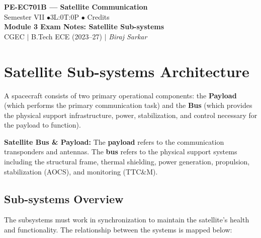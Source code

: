 \documentclass[12pt,a4paper]{article}
\begin{document}

\begin{center}
  {\LARGE\bfseries\color{myred} PE-EC701B --- Satellite Communication}\\[5pt]
  {\normalsize\color{mydark} Semester VII \quad$\bullet$\quad 3L:0T:0P \quad$\bullet$ Credits}\\[3pt]
  {\normalsize\color{myteal}\textbf{Module 3 Exam Notes: Satellite Sub-systems}}\\[3pt]
  {\small\color{mydark} CGEC \;$|$\; B.Tech ECE (2023--27) \;$|$\; \textit{Biraj Sarkar}}
\end{center}
\vspace{2pt}
\noindent{\color{myred}\rule{\linewidth}{1.5pt}}
\vspace{2pt}

\hypersetup{linkcolor=mydark}
\tableofcontents
\hypersetup{linkcolor=myteal}
\newpage

\section{Satellite Sub-systems Architecture}

A spacecraft consists of two primary operational components: the \textbf{Payload} (which performs the primary communication task) and the \textbf{Bus} (which provides the physical support infrastructure, power, stabilization, and control necessary for the payload to function).

\begin{tcolorbox}[defbox]
\textbf{Satellite Bus \& Payload:} The \textbf{payload} refers to the communication transponders and antennas. The \textbf{bus} refers to the physical support systems including the structural frame, thermal shielding, power generation, propulsion, stabilization (AOCS), and monitoring (TTC\&M).
\end{tcolorbox}

\subsection{Sub-systems Overview}
The subsystems must work in synchronization to maintain the satellite's health and functionality. The relationship between the systems is mapped below:
\end{document}
